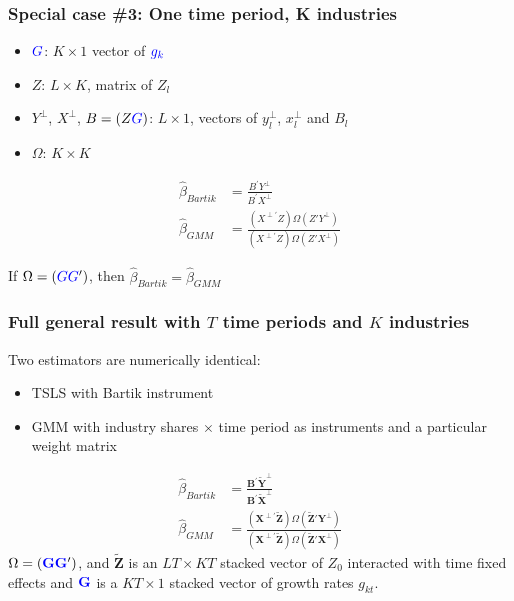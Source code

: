 \documentclass[notes,11pt, aspectratio=169]{beamer}
\begin{document}
  
  \begin{frame}[label=kindustries]
  \frametitle{Special case \#3: One time period, K industries}
  
  \begin{itemize}
    \setlength\itemsep{1em}
  \item $\textcolor{blue}{G}$: $K \times 1$ vector of $\textcolor{blue}{g_k}$
  \item $Z$: $L \times K$, matrix of $Z_l$
  \item $Y^\perp$, $X^\perp$, $B = (Z \textcolor{blue}{G})$: $L \times 1$, vectors of $y_l^\perp$, $x_l^\perp$ and $B_l$
  \item $\Omega$: $K\times K$
  \end{itemize}
  
  
  
  \begin{align*}
    \hat{\beta}_{Bartik} &= \frac{B^\prime  Y^\perp}{B^\prime X^\perp}\\
    \hat{\beta}_{GMM} &= \frac{(X^{\perp \prime}Z)\Omega (Z'Y^\perp)}{(X^{\perp \prime} Z)\Omega (Z'X^\perp)}
  \end{align*} 
  
   If $\Omega = (\textcolor{blue}{G} \textcolor{blue}{G}^\prime)$, then $\hat{\beta}_{Bartik}=\hat{\beta}_{GMM}$   
  
  \end{frame}
  
  \begin{frame}
  \frametitle{Full general result with $T$ time periods and $K$ industries}
  
  Two estimators are numerically identical:
  \begin{itemize}
  \item TSLS with Bartik instrument
  \item GMM with industry shares $\times$ time period as instruments and a particular weight matrix 
  \end{itemize}
  \begin{align*}
    \hat{\beta}_{Bartik} &= \frac{\mathbf{B}^\prime  \widetilde{\mathbf{Y}}^\perp}{\mathbf{B}^\prime \widetilde{\mathbf{X}}^\perp}\\
    \hat{\beta}_{GMM} &= \frac{(\mathbf{X}^{\perp \prime}\widetilde{\mathbf{Z}})\Omega (\widetilde{\mathbf{Z}}'\mathbf{Y}^\perp)}{(\mathbf{X}^{\perp \prime} \widetilde{\mathbf{Z}})\Omega (\widetilde{\mathbf{Z}}'\mathbf{X}^\perp)}
  \end{align*} 
  $\Omega = (\textcolor{blue}{\mathbf{G}}
  \textcolor{blue}{\mathbf{G}}^\prime)$, and $\widetilde{\mathbf{Z}}$ is
  an $LT \times KT$ stacked vector of $Z_{0}$ interacted with time fixed
  effects and $\textcolor{blue}{\mathbf{G}}$ is a $KT \times 1$ stacked
  vector of growth rates $g_{kt}$.
  
  \end{frame}
  
\end{document}

